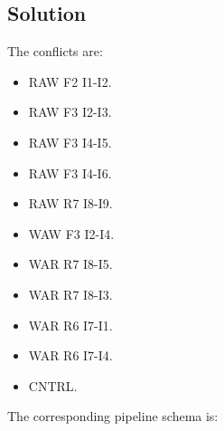 \subsection*{Solution}
The conflicts are:
\begin{itemize}
    \item RAW F2 I1-I2.
    \item RAW F3 I2-I3.
    \item RAW F3 I4-I5.
    \item RAW F3 I4-I6.
    \item RAW R7 I8-I9.
    \item WAW F3 I2-I4.
    \item WAR R7 I8-I5.
    \item WAR R7 I8-I3.
    \item WAR R6 I7-I1.
    \item WAR R6 I7-I4.
    \item CNTRL.
\end{itemize}
The corresponding pipeline schema is: 
